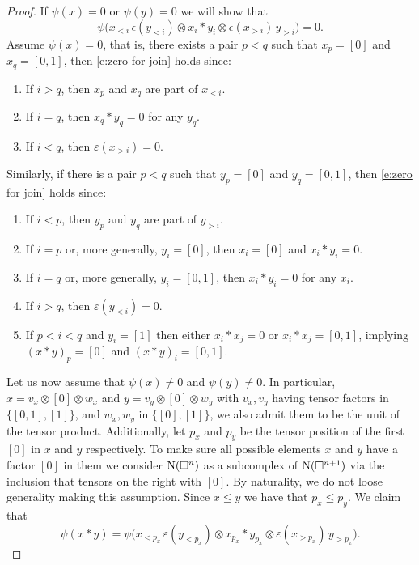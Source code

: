 \begin{proof}
	If $\psi(x) = 0$ or $\psi(y) = 0$ we will show that
	\begin{equation} \label{e:zero for join}
	\psi \big( x_{<i}\, \epsilon(y_{<i}) \otimes x_i \ast y_i \otimes \epsilon(x_{>i}) \, y_{>i} \big) = 0.
	\end{equation}
	Assume $\psi(x) = 0$, that is, there exists a pair $p < q$ such that $x_p = [0]$ and $x_q = [0,1]$, then \eqref{e:zero for join} holds since:
	\begin{enumerate}
		\item If $i > q$, then $x_p$ and $x_q$ are part of $x_{<i}$.
		\item If $i = q$, then $x_q \ast y_q = 0$ for any $y_q$.
		\item If $i < q$, then $\varepsilon(x_{>i}) = 0$.
	\end{enumerate}
	Similarly, if there is a pair $p < q$ such that $y_p = [0]$ and $y_q = [0,1]$,  then \eqref{e:zero for join} holds since:
	\begin{enumerate}
		\item If $i < p$, then $y_p$ and $y_q$ are part of $y_{>i}$.
		\item If $i = p$ or, more generally, $y_i = [0]$, then $x_i = [0]$ and $x_i \ast y_i = 0$.
		\item If $i = q$ or, more generally, $y_i = [0,1]$, then $x_i \ast y_i = 0$ for any $x_i$.
		\item If $i > q$, then $\varepsilon(y_{<i}) = 0$.
		\item If $p < i < q$ and $y_i = [1]$ then either $x_i \ast x_j = 0$ or $x_i \ast x_j = [0,1]$, implying $(x \ast y)_p = [0]$ and $(x \ast y)_i = [0,1]$.
	\end{enumerate}
	Let us now assume that $\psi(x) \neq 0$ and $\psi(y) \neq 0$.
	In particular, $x = v_x \otimes [0] \otimes w_x$ and $y = v_y \otimes [0] \otimes w_y$ with $v_x, v_y$ having tensor factors in $\{[0,1], [1]\}$, and $w_x, w_y$ in $\{[0], [1]\}$, we also admit them to be the unit of the tensor product.
	Additionally, let $p_x$ and $p_y$ be the tensor position of the first $[0]$ in $x$ and $y$ respectively.
	To make sure all possible elements $x$ and $y$ have a factor $[0]$ in them we consider $\operatorname{N}(\square^n)$ as a subcomplex of $\operatorname{N}(\square^{n+1})$ via the inclusion that tensors on the right with $[0]$.
	By naturality, we do not loose generality making this assumption.
	Since $x \leq y$ we have that $p_x \leq p_y$.
	We claim that
	\begin{equation*}
	\psi(x \ast y) = \psi \big( x_{<p_x} \, \varepsilon(y_{<p_x}) \otimes x_{p_x} \ast y_{p_x} \otimes \varepsilon(x_{>p_x}) \, y_{>p_x} \big).

\end{equation*}
\end{proof}
